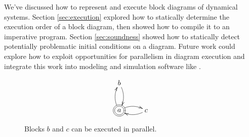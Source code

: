 \documentclass[twocolumn]{article}
\begin{document}
We've discussed how to represent and execute block diagrams of dynamical systems. Section \ref{sec:execution} explored how to statically determine the execution order of a block diagram, then showed how to compile it to an imperative program. Section \ref{sec:soundness} showed how to statically detect potentially problematic initial conditions on a diagram. Future work could explore how to exploit opportunities for parallelism in diagram execution and integrate this work into modeling and simulation software like \cite{cadCAD.jl}.

\begin{figure}[h]
\[
\xymatrix{
b \\
*++[o][F=]{a} \ar@/^/[r] \ar@/_/@{<-}[r] \ar@/^/[u] \ar@/_/@{<-}[u] & c \\
}
\]
    \caption{Blocks $b$ and $c$ can be executed in parallel.}
    \label{fig:soundness}
\end{figure}

\printbibliography
\end{document}
